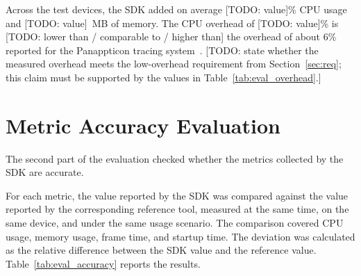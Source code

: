 
Across the test devices, the SDK added on average [TODO: value]\% CPU usage and [TODO: value]~MB of memory. %
The CPU overhead of [TODO: value]\% is [TODO: lower than / comparable to / higher than] the overhead of about 6\% reported for the Panappticon tracing system~\cite{Panappticon}. [TODO: state whether the measured overhead meets the low-overhead requirement from Section~\ref{sec:req}; this claim must be supported by the values in Table~\ref{tab:eval_overhead}.]

\section{Metric Accuracy Evaluation}
\label{sec:eval_accuracy}

The second part of the evaluation checked whether the metrics collected by the SDK are accurate. 

For each metric, the value reported by the SDK was compared against the value reported by the corresponding reference tool, measured at the same time, on the same device, and under the same usage scenario. The comparison covered CPU usage, memory usage, frame time, and startup time.  The deviation was calculated as the relative difference between the SDK value and the reference value. Table~\ref{tab:eval_accuracy} reports the results.

